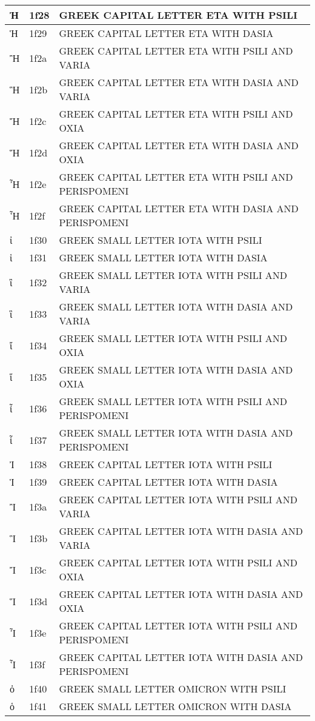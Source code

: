 \documentclass[12pt,letterpaper,openany]{book}
\begin{document}
\begin{center}
\begin{supertabular}{|m{0.25in}|m{0.5in}|m{4in}|}
Ἠ & 1f28 & GREEK CAPITAL LETTER ETA WITH PSILI\\\hline
Ἡ & 1f29 & GREEK CAPITAL LETTER ETA WITH DASIA\\\hline
Ἢ & 1f2a & GREEK CAPITAL LETTER ETA WITH PSILI AND VARIA\\\hline
Ἣ & 1f2b & GREEK CAPITAL LETTER ETA WITH DASIA AND VARIA\\\hline
Ἤ & 1f2c & GREEK CAPITAL LETTER ETA WITH PSILI AND OXIA\\\hline
Ἥ & 1f2d & GREEK CAPITAL LETTER ETA WITH DASIA AND OXIA\\\hline
Ἦ & 1f2e & GREEK CAPITAL LETTER ETA WITH PSILI AND PERISPOMENI\\\hline
Ἧ & 1f2f & GREEK CAPITAL LETTER ETA WITH DASIA AND PERISPOMENI\\\hline
ἰ & 1f30 & GREEK SMALL LETTER IOTA WITH PSILI\\\hline
ἱ & 1f31 & GREEK SMALL LETTER IOTA WITH DASIA\\\hline
ἲ & 1f32 & GREEK SMALL LETTER IOTA WITH PSILI AND VARIA\\\hline
ἳ & 1f33 & GREEK SMALL LETTER IOTA WITH DASIA AND VARIA\\\hline
ἴ & 1f34 & GREEK SMALL LETTER IOTA WITH PSILI AND OXIA\\\hline
ἵ & 1f35 & GREEK SMALL LETTER IOTA WITH DASIA AND OXIA\\\hline
ἶ & 1f36 & GREEK SMALL LETTER IOTA WITH PSILI AND PERISPOMENI\\\hline
ἷ & 1f37 & GREEK SMALL LETTER IOTA WITH DASIA AND PERISPOMENI\\\hline
Ἰ & 1f38 & GREEK CAPITAL LETTER IOTA WITH PSILI\\\hline
Ἱ & 1f39 & GREEK CAPITAL LETTER IOTA WITH DASIA\\\hline
Ἲ & 1f3a & GREEK CAPITAL LETTER IOTA WITH PSILI AND VARIA\\\hline
Ἳ & 1f3b & GREEK CAPITAL LETTER IOTA WITH DASIA AND VARIA\\\hline
Ἴ & 1f3c & GREEK CAPITAL LETTER IOTA WITH PSILI AND OXIA\\\hline
Ἵ & 1f3d & GREEK CAPITAL LETTER IOTA WITH DASIA AND OXIA\\\hline
Ἶ & 1f3e & GREEK CAPITAL LETTER IOTA WITH PSILI AND PERISPOMENI\\\hline
Ἷ & 1f3f & GREEK CAPITAL LETTER IOTA WITH DASIA AND PERISPOMENI\\\hline
ὀ & 1f40 & GREEK SMALL LETTER OMICRON WITH PSILI\\\hline
ὁ & 1f41 & GREEK SMALL LETTER OMICRON WITH DASIA\\\hline

\end{supertabular}
\end{center}
\end{document}
